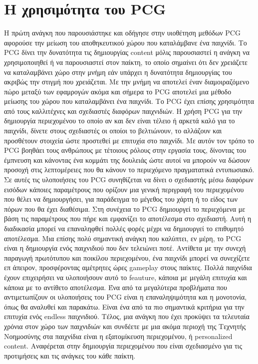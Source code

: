 \section{Η χρησιμότητα του PCG}
	Η πρώτη ανάγκη που παρουσιάστηκε και οδήγησε στην υιοθέτηση μεθόδων PCG αφορούσε την μείωση του αποθηκευτικού χώρου που καταλάμβανε ένα παιχνίδι. Το PCG δίνει την δυνατότητα τις δημιουργίας content μόλις παρουσιαστεί η ανάγκη να χρησιμοποιηθεί ή να παρουσιαστεί στον παίκτη, το οποίο σημαίνει ότι δεν χρειάζετε να καταλαμβάνει χώρο στην μνήμη εάν υπάρχει η δυνατότητα δημιουργίας του ακριβώς την στιγμή που χρειάζεται. Με την μνήμη να αποτελεί έναν διαμοιραζόμενο πώρο μεταξύ των εφαμρογών ακόμα και σήμερα το PCG αποτελεί μια μέθοδο μείωσης του χώρου που καταλαμβάνει ένα παιχνίδι.
\newline
	Το PCG έχει επίσης χρησιμότητα από τους καλλιτέχνες και σχεδιαστές διαφόρων παιχνιδιών. Η χρήση PCG για την δημιουργία περιεχομένου το οποίο αν και δεν είναι τέλειο ή αρκετά καλό για το παιχνίδι, δίνετε στους σχεδιαστές οι οποίοι το βελτιώνουν, το αλλάζουν και προσθέτουν στοιχεία ώστε προστεθεί με επιτυχία στο παιχνίδι. Με αυτόν τον τρόπο το PCG βοηθάει τους ανθρώπους με τέτοιους ρόλους στην εργασία τους, δίνοντας του έμπνευση και κάνοντας ένα κομμάτι της δουλειάς ώστε αυτοί να μπορούν να δώσουν προσοχή στις λεπτομέρειες που θα κάνουν το περιεχόμενο πραγματατικά εντυπωσιακό. Σε αυτές τις υλοποιήσεις του PCG συνηθίζεται να δίνει ο σχεδιαστής μέσω διαφόρων εισόδων κάποιες παραμέτρους που ορίζουν μια γενική περιγραφή του περιεχομένου που θέλει να δημιουργήσει, για παράδειγμα το μέγεθος του χάρτη ή το είδος των πόρων που θα έχει διαθέσιμα. Στη συνέχεια το PCG δημιουργεί το περιεχόμενα με βάση τις παραμέτρους που πήρε και εμφανίζει το αποτέλεσμα στο σχεδιαστή. Αυτή η διαδικασία μπορεί να επαναληφθεί πολλές φορές μέχρι να δημιουργεί το επιθυμητό αποτέλεσμα.
\newline
	Μια επίσης πολύ σημαντική ανάγκη που καλύπτει, εν μέρη, το PCG είναι η δημιουργία ενός παιχνιδιού που δεν τελειώνει ποτέ. Αντίθετα με την συνεχή παραγωγή πρωτότυπου και ποικίλου περιεχομένου, ένα παιχνίδι μπορεί να συνεχίζετε επ άπειρον, προσφέροντας αμέτρητες ώρες gameplay στους παίκτες. Πολλά παιχνίδια έχουν επιχειρήσει να υλοποιήσουν αυτό το feauture, κάποια με μεγάλη επιτυχία και κάποια με το αντίθετο αποτέλεσμα. Ένα από τα μεγαλύτερα προβλήματα που αντιμετωπίζουν οι υλοποιήσεις του PCG είναι η επαναληψιμότητα και η μονοτονία, όπως θα αναλυθεί και παρακάτω. Είναι ένα από τα πιο σημαντικά κριτήρια για την επιτυχία ενός endless παιχνιδιού.
\newline
	Τέλος, μια ανάγκη που έχει προκύψει τα τελευταία χρόνια στον χώρο των παιχνιδιών και συνδέετε με μια ακόμα περιοχή της Τεχνητής Νοημοσύνης στα παιχνίδια είναι η εξατομίκευση περιεχομένου, ή personalized content. Αναφέρεται στην δημιουργία περιεχομένου που είναι σχεδιασμένο για τις προτιμήσεις και τις ανάγκες του κάθε παίκτη.

